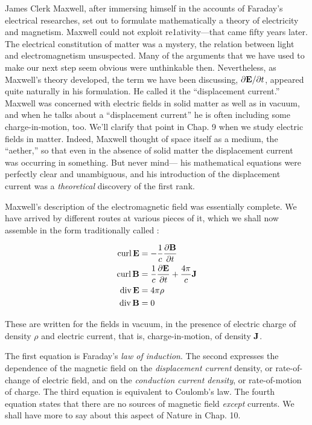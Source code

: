 James Clerk Maxwell, after immersing himself in the accounts of
Faraday's electrical researches, set out to formulate mathematically
a theory of electricity and magnetism. Maxwell could not exploit
re1ativity---that came fifty years later. The electrical constitution
of matter was a mystery, the relation between light and electromagnetism
unsuspected. Many of the arguments that we have used to
make our next step seem obvious were unthinkable then. 
Nevertheless, as Maxwell's theory developed, the term we have been 
discussing, $\partial\mathbf{E}/\partial t$, appeared quite naturally in his formulation. He called
it the ``displacement current.'' Maxwell was concerned with electric
fields in solid matter as well as in vacuum, and when he talks about
a ``displacement current'' he is often including some 
charge-in-motion, too. We'll clarify that point in Chap. 9 when we study electric
fields in matter. Indeed, Maxwell thought of space itself as a
medium, the ``aether,'' so that even in the absence of solid matter the
displacement current was occurring in something. But never mind---
his mathematical equations were perfectly clear and unambiguous,
and his introduction of the displacement current was a \emph{theoretical}
discovery of the first rank. 

Maxwell's description of the electromagnetic field was essentially
complete. We have arrived by different routes at various pieces of it,
which we shall now assemble in the form traditionally called
:
\begin{framed}
\begin{align}
\begin{split}
  \operatorname{curl}\mathbf{E} &= -\frac{1}{c}\frac{\partial\mathbf{B}}{\partial t} \\
  \operatorname{curl}\mathbf{B} &= \frac{1}{c}\frac{\partial\mathbf{E}}{\partial t} + \frac{4\pi}{c}\mathbf{J} \\
  \operatorname{div}\mathbf{E} &= 4\pi\rho \\
  \operatorname{div}\mathbf{B} &= 0
\end{split}  
\end{align}
\end{framed}
These are written for the fields in vacuum, in the presence of electric
charge of density $\rho$ and electric current, that is, charge-in-motion,
of density $\mathbf{J}$.


The first equation is Faraday's \emph{law of induction}. The second
expresses the dependence of the magnetic field on the \emph{displacement
current} density, or rate-of-change of electric field, and on the \emph{conduction
current density}, or rate-of-motion of charge. The third
equation is equivalent to Coulomb's law. The fourth equation states
that there are no sources of magnetic field \emph{except} currents. We shall
have more to say about this aspect of Nature in Chap. 10.

